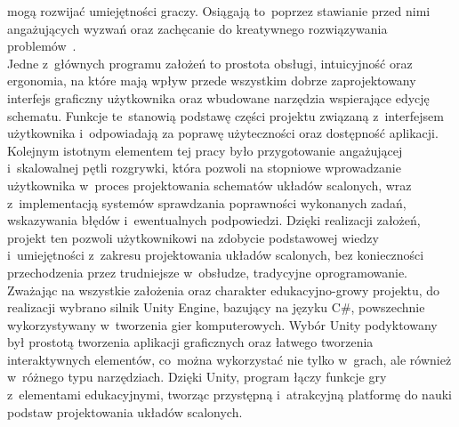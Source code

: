 mogą rozwijać umiejętności graczy.
Osiągają to~poprzez stawianie przed nimi angażujących wyzwań oraz zachęcanie do kreatywnego rozwiązywania problemów~\cite{videogames}.\\
\indent Jedne z~głównych programu założeń to prostota obsługi, intuicyjność oraz ergonomia,
na które mają wpływ przede wszystkim dobrze zaprojektowany interfejs graficzny użytkownika
oraz wbudowane narzędzia wspierające edycję schematu.
Funkcje te~stanowią podstawę części projektu związaną z~interfejsem użytkownika
i~odpowiadają za poprawę użyteczności
oraz dostępność aplikacji.\\
\indent Kolejnym istotnym elementem tej pracy było przygotowanie angażującej
i~skalowalnej pętli rozgrywki,
która pozwoli na stopniowe wprowadzanie użytkownika w~proces projektowania schematów układów scalonych,
wraz z~implementacją systemów sprawdzania poprawności wykonanych zadań, wskazywania błędów i~ewentualnych podpowiedzi.
Dzięki realizacji założeń, projekt ten pozwoli użytkownikowi na zdobycie podstawowej wiedzy
i~umiejętności z~zakresu projektowania układów scalonych,
bez konieczności przechodzenia przez trudniejsze w~obsłudze, tradycyjne oprogramowanie.\\
\indent Zważając na wszystkie założenia oraz charakter edukacyjno-growy projektu,
do realizacji wybrano silnik Unity Engine,
bazujący na języku C\#,
powszechnie wykorzystywany w~tworzenia gier komputerowych.
Wybór Unity podyktowany był prostotą tworzenia aplikacji graficznych oraz łatwego tworzenia interaktywnych elementów,
co~można wykorzystać nie tylko w~grach, ale również w~różnego typu narzędziach.
Dzięki Unity,
program łączy funkcje gry z~elementami edukacyjnymi,
tworząc przystępną i~atrakcyjną platformę do nauki podstaw projektowania układów scalonych.

